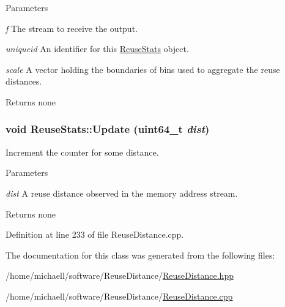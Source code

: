 \begin{DoxyParams}{Parameters}
\item[{\em f}]The stream to receive the output. \item[{\em uniqueid}]An identifier for this \hyperlink{class_reuse_stats}{ReuseStats} object. \item[{\em scale}]A vector holding the boundaries of bins used to aggregate the reuse distances.\end{DoxyParams}
\begin{DoxyReturn}{Returns}
none 
\end{DoxyReturn}
\hypertarget{class_reuse_stats_a5383136c63ed260d9aad44a8d048a2ed}{
\subsubsection[{Update}]{\setlength{\rightskip}{0pt plus 5cm}void ReuseStats::Update (uint64\_\-t {\em dist})}}
\label{class_reuse_stats_a5383136c63ed260d9aad44a8d048a2ed}
Increment the counter for some distance.


\begin{DoxyParams}{Parameters}
\item[{\em dist}]A reuse distance observed in the memory address stream.\end{DoxyParams}
\begin{DoxyReturn}{Returns}
none 
\end{DoxyReturn}


Definition at line 233 of file ReuseDistance.cpp.



The documentation for this class was generated from the following files:\begin{DoxyCompactItemize}
\item 
/home/michaell/software/ReuseDistance/\hyperlink{_reuse_distance_8hpp}{ReuseDistance.hpp}\item 
/home/michaell/software/ReuseDistance/\hyperlink{_reuse_distance_8cpp}{ReuseDistance.cpp}\end{DoxyCompactItemize}
